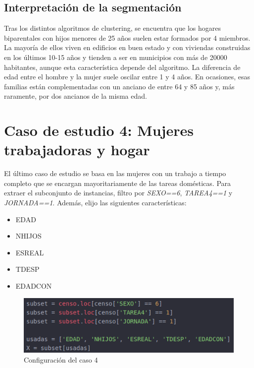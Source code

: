\subsection{Interpretación de la segmentación}

Tras los distintos algoritmos de clustering, se encuentra que los hogares biparentales con hijos menores de 25 años suelen estar formados por 4 miembros. La mayoría de ellos viven en edificios en buen estado y con viviendas construidas en los últimos 10-15 años y tienden a ser en municipios con más de 20000 habitantes, aunque esta característica depende del algoritmo. La diferencia de edad entre el hombre y la mujer suele oscilar entre 1 y 4 años. En ocasiones, esas familias están complementadas con un anciano de entre 64 y 85 años y, más raramente, por dos ancianos de la misma edad. 

\section{Caso de estudio 4: Mujeres trabajadoras y hogar}

El último caso de estudio se basa en las mujeres con un trabajo  a tiempo completo que se encargan mayoritariamente de las tareas domésticas. Para extraer el subconjunto de instancias, filtro por \textit{SEXO==6}, \textit{TAREA4==1} y \textit{JORNADA==1}. Además, elijo las siguientes características:

\begin{itemize}
	\item EDAD
	\item NHIJOS
	\item ESREAL
	\item TDESP
	\item EDADCON
\end{itemize}

\begin{figure}[H] %
	\centering
	\includegraphics[scale=0.5]{capt5.png}  %
	\caption{Configuración del caso 4} 
	\label{fig:configuración-caso4}
\end{figure}


